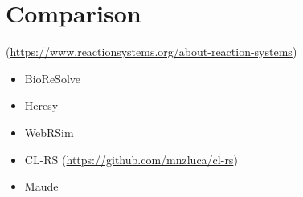 
\section{Comparison}\label{sec:related}
(\url{https://www.reactionsystems.org/about-reaction-systems})
\begin{itemize}
\item BioReSolve
\item Heresy
\item WebRSim
\item CL-RS (\url{https://github.com/mnzluca/cl-rs})
\item Maude
\end{itemize}
